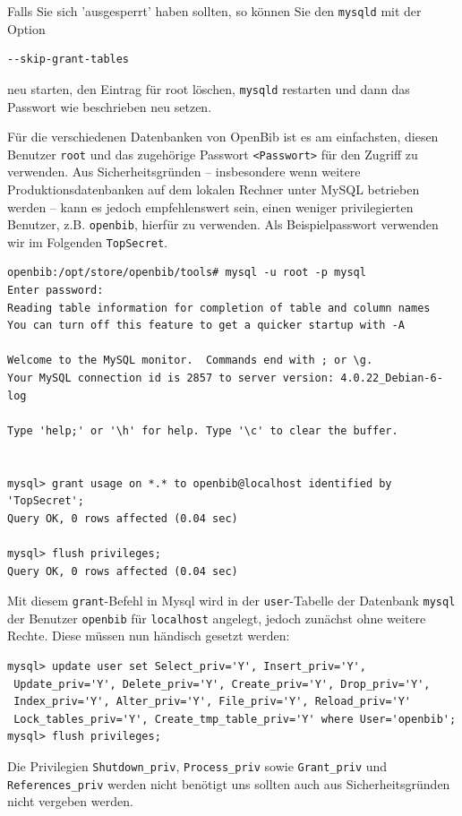 \documentclass[11pt, twoside, a4paper, BCOR8mm, DIV12, bibtotoc,idxtotoc]{scrbook}
\begin{document}
Falls Sie sich 'ausgesperrt' haben sollten, so können Sie den
\texttt{mysqld} mit der Option
\begin{verbatim}
--skip-grant-tables
\end{verbatim}
neu starten, den Eintrag für root löschen, \texttt{mysqld} restarten
und dann das Passwort wie beschrieben neu setzen.

Für die verschiedenen Datenbanken von OpenBib ist es am einfachsten,
diesen Benutzer \texttt{root} und das zugehörige Passwort
\texttt{<Passwort>} für den Zugriff zu verwenden. Aus
Sicherheitsgründen -- insbesondere wenn weitere
Produktionsdatenbanken auf dem lokalen Rechner unter MySQL betrieben
werden -- kann es jedoch empfehlenswert sein, einen weniger
privilegierten Benutzer, z.B. \texttt{openbib}, hierfür zu verwenden.
Als Beispielpasswort verwenden wir im Folgenden \texttt{TopSecret}.


\begin{verbatim}
openbib:/opt/store/openbib/tools# mysql -u root -p mysql
Enter password:
Reading table information for completion of table and column names
You can turn off this feature to get a quicker startup with -A

Welcome to the MySQL monitor.  Commands end with ; or \g.
Your MySQL connection id is 2857 to server version: 4.0.22_Debian-6-log

Type 'help;' or '\h' for help. Type '\c' to clear the buffer.


mysql> grant usage on *.* to openbib@localhost identified by 'TopSecret';
Query OK, 0 rows affected (0.04 sec)

mysql> flush privileges;
Query OK, 0 rows affected (0.04 sec)
\end{verbatim}

Mit diesem \texttt{grant}-Befehl in Mysql wird in der
\texttt{user}-Tabelle der Datenbank \texttt{mysql} der Benutzer
\texttt{openbib} für \texttt{localhost} angelegt, jedoch zunächst
ohne weitere Rechte. Diese müssen nun händisch gesetzt werden:

\begin{verbatim}
mysql> update user set Select_priv='Y', Insert_priv='Y',
 Update_priv='Y', Delete_priv='Y', Create_priv='Y', Drop_priv='Y', 
 Index_priv='Y', Alter_priv='Y', File_priv='Y', Reload_priv='Y' 
 Lock_tables_priv='Y', Create_tmp_table_priv='Y' where User='openbib';
mysql> flush privileges;
\end{verbatim}

Die Privilegien \texttt{Shutdown\_priv},
\texttt{Process\_priv} sowie \texttt{Grant\_priv}
und \texttt{References\_priv} werden nicht benötigt uns sollten auch
aus Sicherheitsgründen nicht vergeben werden.
\end{document}
